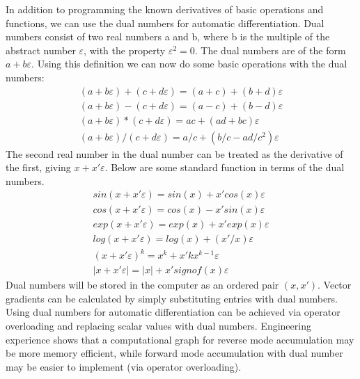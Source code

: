\documentclass[]{article}
\begin{document}
In addition to programming the known derivatives of basic operations and functions, we can use the dual numbers for automatic differentiation.  Dual numbers consist of two real numbers a and b, where b is the multiple of the abstract number $\varepsilon$, with the property $\varepsilon^2 = 0$.  The dual numbers are of the form $a + b\varepsilon$.  Using this definition we can now do some basic operations with the dual numbers:
\begin{gather}
(a + b\varepsilon) + (c + d\varepsilon) = (a + c) + (b + d)\varepsilon \\
(a + b\varepsilon) - (c + d\varepsilon) = (a - c) + (b - d)\varepsilon \\
(a + b\varepsilon) * (c + d\varepsilon) = ac + (ad + bc)\varepsilon \\
(a + b\varepsilon) / (c + d\varepsilon) = a/c + (b/c - ad/c^2)\varepsilon 
\end{gather}
The second real number in the dual number can be treated as the derivative of the first, giving $x + x'\varepsilon$.  Below are some standard function in terms of the dual numbers.
\begin{gather}
sin(x + x'\varepsilon) = sin(x) + x'cos(x)\varepsilon \\
cos(x + x'\varepsilon) = cos(x) - x'sin(x)\varepsilon \\
exp(x + x'\varepsilon) = exp(x) + x'exp(x)\varepsilon \\
log(x + x'\varepsilon) = log(x) + (x'/ x)\varepsilon \\
(x + x'\varepsilon)^k = x^k + x'kx^{k-1}\varepsilon\\
|x + x'\varepsilon| = |x| + x'signof(x)\varepsilon
\end{gather}
Dual numbers will be stored in the computer as an ordered pair $(x,x')$.  Vector gradients can be calculated by simply substituting entries with dual numbers.  Using dual numbers for automatic differentiation can be achieved via operator overloading and replacing scalar values with dual numbers.  Engineering experience shows that a computational graph for reverse mode accumulation may be more memory efficient, while forward mode accumulation with dual number may be easier to implement (via operator overloading).  
\end{document}
